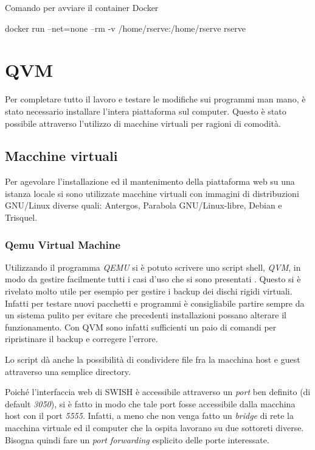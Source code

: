 \documentclass[10pt,titlepage,twoside,a4paper]{report}
\newenvironment{code}{\singlespacing\captionsetup{type=listing}}{}
\begin{document}
\begin{code}
    \caption{Comando per avviare il container Docker}
    \begin{shellcode*}{}
docker run --net=none --rm -v /home/rserve:/home/rserve rserve
    \end{shellcode*}
    \label{lst:dockerruncommand}
\end{code}


\section{QVM}
Per completare tutto il lavoro e testare le modifiche sui programmi man 
mano, è stato necessario installare l'intera piattaforma sul computer. 
Questo è stato possibile attraverso l'utilizzo di macchine virtuali 
per ragioni di comodità.

\subsection{Macchine virtuali}
Per agevolare l'installazione ed il mantenimento della piattaforma web su una 
istanza locale si sono utilizzate macchine virtuali con immagini di 
distribuzioni GNU/Linux diverse quali: Antergos, Parabola GNU/Linux-libre, 
Debian e Trisquel.

\subsubsection{Qemu Virtual Machine}
Utilizzando il programma \emph{QEMU} \cite{qemu} si è potuto scrivere uno
script shell, \emph{QVM}, in modo da gestire facilmente tutti i casi d'uso che 
si sono presentati \cite{qvm}. Questo si è rivelato molto utile per esempio per 
gestire i backup dei dischi rigidi virtuali. Infatti per testare nuovi 
pacchetti e programmi è consigliabile partire sempre da un sistema pulito
per evitare che precedenti installazioni possano alterare il funzionamento.
Con QVM sono infatti sufficienti un paio di comandi per ripristinare il 
backup e corregere l'errore.

Lo script dà anche la possibilità di condividere file fra la macchina host 
e guest attraverso una semplice directory.

Poiché l'interfaccia web di SWISH è accessibile attraverso un \emph{port} 
ben definito (di default \emph{3050}), si è fatto in modo che tale port 
fosse accessibile dalla macchina host con il port \emph{5555}. Infatti, a meno 
che non venga fatto un \emph{bridge} di rete la macchina virtuale ed il 
computer che la ospita lavorano su due sottoreti diverse. Bisogna quindi fare
un \emph{port forwarding} esplicito delle porte interessate.
\end{document}
